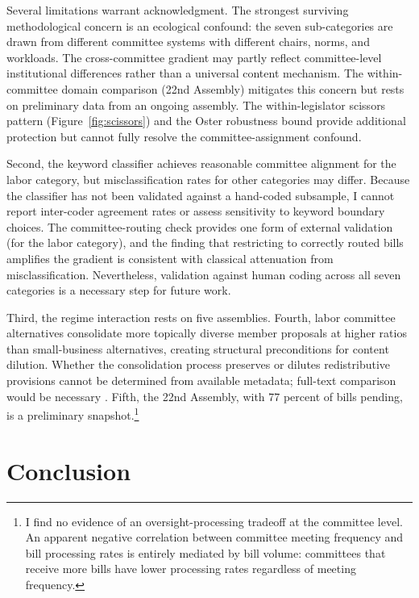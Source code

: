 \documentclass[11pt]{article}
\begin{document}
Several limitations warrant acknowledgment. The strongest surviving methodological concern is an ecological confound: the seven sub-categories are drawn from different committee systems with different chairs, norms, and workloads. The cross-committee gradient may partly reflect committee-level institutional differences rather than a universal content mechanism. The within-committee domain comparison (22nd Assembly) mitigates this concern but rests on preliminary data from an ongoing assembly. The within-legislator scissors pattern (Figure~\ref{fig:scissors}) and the Oster robustness bound provide additional protection but cannot fully resolve the committee-assignment confound.

Second, the keyword classifier achieves reasonable committee alignment for the labor category, but misclassification rates for other categories may differ. Because the classifier has not been validated against a hand-coded subsample, I cannot report inter-coder agreement rates or assess sensitivity to keyword boundary choices. The committee-routing check provides one form of external validation (for the labor category), and the finding that restricting to correctly routed bills amplifies the gradient is consistent with classical attenuation from misclassification. Nevertheless, validation against human coding across all seven categories is a necessary step for future work.

Third, the regime interaction rests on five assemblies. Fourth, labor committee alternatives consolidate more topically diverse member proposals at higher ratios than small-business alternatives, creating structural preconditions for content dilution. Whether the consolidation process preserves or dilutes redistributive provisions cannot be determined from available metadata; full-text comparison would be necessary \citep[cf.][]{ka2025}. Fifth, the 22nd Assembly, with 77 percent of bills pending, is a preliminary snapshot.\footnote{I find no evidence of an oversight-processing tradeoff at the committee level. An apparent negative correlation between committee meeting frequency and bill processing rates is entirely mediated by bill volume: committees that receive more bills have lower processing rates regardless of meeting frequency.}


\section{Conclusion}
\label{sec:conclusion}
\end{document}
